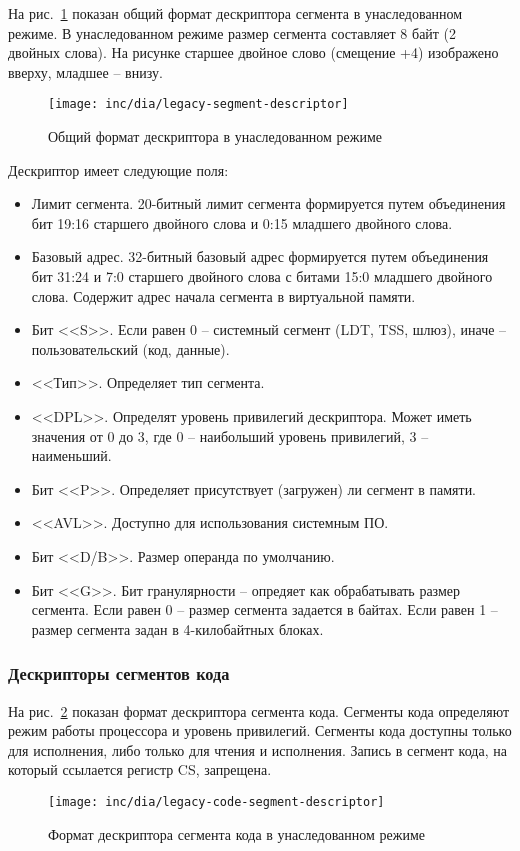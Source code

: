 На рис.~\ref{fig:legacy-segment-descriptor-format} показан общий формат дескриптора сегмента в унаследованном режиме.
В унаследованном режиме размер сегмента составляет 8 байт (2 двойных слова). На рисунке старшее двойное слово (смещение +4)
изображено вверху, младшее -- внизу.

\begin{figure}[ht!]
  \centering
  \texttt{[image: inc/dia/legacy-segment-descriptor]}
  \caption{Общий формат дескриптора в унаследованном режиме}
  \label{fig:legacy-segment-descriptor-format}
\end{figure}

Дескриптор имеет следующие поля:
\begin{itemize}
\item Лимит сегмента. 20-битный лимит сегмента формируется путем объединения
	бит 19:16 старшего двойного слова и 0:15 младшего двойного слова.
\item Базовый адрес. 32-битный базовый адрес формируется путем объединения бит 31:24 и 7:0 старшего двойного слова
	с битами 15:0 младшего двойного слова. Содержит адрес начала сегмента в виртуальной памяти.
\item Бит <<S>>. Если равен 0 -- системный сегмент (LDT, TSS, шлюз), иначе -- пользовательский (код, данные).
\item <<Тип>>. Определяет тип сегмента.
\item <<DPL>>. Определят уровень привилегий дескриптора. Может иметь значения от 0 до 3, где 0 -- наибольший
	уровень привилегий, 3 -- наименьший.
\item Бит <<P>>. Определяет присутствует (загружен) ли сегмент в памяти.
\item <<AVL>>. Доступно для использования системным ПО.
\item Бит <<D/B>>. Размер операнда по умолчанию.
\item Бит <<G>>. Бит гранулярности -- опредяет как обрабатывать размер сегмента. Если равен 0 -- размер сегмента
	задается в байтах. Если равен 1 -- размер сегмента задан в 4-килобайтных блоках.
\end{itemize}

\subsubsection*{Дескрипторы сегментов кода}
На рис.~\ref{fig:legacy-code-segment-descriptor-format} показан формат дескриптора сегмента кода.
Сегменты кода определяют режим работы процессора и уровень привилегий. Сегменты кода доступны только для исполнения,
либо только для чтения и исполнения. Запись в сегмент кода, на который ссылается регистр CS, запрещена.
\begin{figure}[ht!]
  \centering
  \texttt{[image: inc/dia/legacy-code-segment-descriptor]}
  \caption{Формат дескриптора сегмента кода в унаследованном режиме}
  \label{fig:legacy-code-segment-descriptor-format}
\end{figure}


